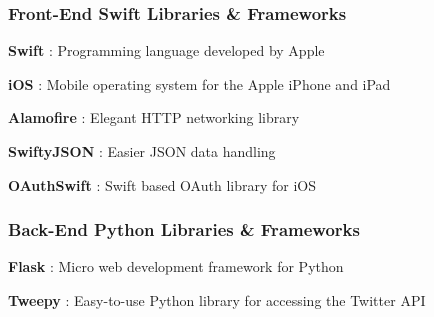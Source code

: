 \documentclass{article}
\begin{document}

\subsubsection*{Front-End Swift Libraries \& Frameworks}
\begin{itemize*}
    \item \textbf{Swift} \cite{swift}: Programming language developed by Apple
    \item \textbf{iOS} \cite{ios}: Mobile operating system for the Apple iPhone and iPad
    \item \textbf{Alamofire} \cite{alamofire}: Elegant HTTP networking library
    \item \textbf{SwiftyJSON} \cite{swiftyjson}: Easier JSON data handling
    \item \textbf{OAuthSwift} \cite{oauthswift}: Swift based OAuth library for iOS
\end{itemize*}

\subsubsection*{Back-End Python Libraries \& Frameworks}
\begin{itemize*}
    \item \textbf{Flask} \cite{flask}: Micro web development framework for Python
    \item \textbf{Tweepy} \cite{tweepy}: Easy-to-use Python library for accessing the Twitter API
\end{itemize*}
\end{document}
